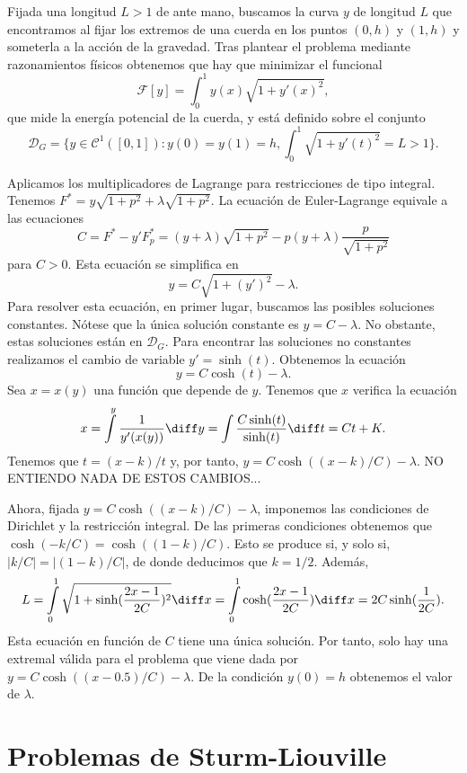 \documentclass{article}
\begin{document}
\begin{ex}
  Fijada una longitud $L > 1$ de ante mano, buscamos la curva $y$ de longitud $L$ que encontramos al
  fijar los extremos de una cuerda en los puntos $(0,h)$ y $(1, h)$ y someterla a la acción de la
  gravedad.  Tras plantear el problema mediante razonamientos físicos obtenemos que hay que
  minimizar el funcional
  \[\mathcal{F}[y] = \int_0^1 y(x) \sqrt{1 + y'(x)^2},\]
  que mide la energía potencial de la cuerda, y está definido sobre el conjunto
  \[\mathcal{D}_G = \{y \in \mathcal{C}^1([0,1]): y(0) = y(1) = h, \int_0^1 \sqrt{1 + y'(t)^2}
    = L > 1\}.\]

  Aplicamos los multiplicadores de Lagrange para restricciones de tipo integral. Tenemos
  $F^{*} = y \sqrt{1+p^2} + \lambda \sqrt{1+p^2}$. La ecuación de Euler-Lagrange equivale a las
  ecuaciones
  \[C = F^{*} - y' F_p^{*} = (y+\lambda)\sqrt{1+p^2} - p(y+\lambda) \frac{p}{\sqrt{1+p^2}}\] para
  $C > 0$. Esta ecuación se simplifica en
  \[y = C \sqrt{1+(y')^2} - \lambda.\] Para resolver esta ecuación, en primer lugar, buscamos las
  posibles soluciones constantes. Nótese que la única solución constante es $y = C-\lambda$. No
  obstante, estas soluciones están en $\mathcal{D}_G$. Para encontrar las soluciones no constantes
  realizamos el cambio de variable $y' = \sinh(t)$. Obtenemos la ecuación
  \[y = C \cosh(t) - \lambda.\] Sea $x = x(y)$ una función que depende de $y$. Tenemos que $x$
  verifica la ecuación
  \[x = \int\limits^{y} \frac{1}{y'(x(y))} \diff y = \int \frac{C\sinh(t)}{\sinh(t)} \diff t =
    Ct+K.\] Tenemos que $t = (x-k) / t$ y, por tanto, $y = C \cosh((x-k)/C) - \lambda$.  NO ENTIENDO
  NADA DE ESTOS CAMBIOS...

  Ahora, fijada $y = C \cosh((x-k)/C) - \lambda$, imponemos las condiciones de Dirichlet y la
  restricción integral. De las primeras condiciones obtenemos que $\cosh(-k/C) =
  \cosh((1-k)/C)$. Esto se produce si, y solo si, $|k/C| = |(1-k)/C|$, de donde deducimos que
  $k = 1/2$. Además,
  \[L = \int\limits_0^1 \sqrt{1+\sinh(\frac{2x-1}{2C})^2} \diff x = \int\limits_0^1
    \cosh(\frac{2x-1}{2C}) \diff x = 2C\sinh(\frac{1}{2C}).\] Esta ecuación en función de $C$ tiene
  una única solución. Por tanto, solo hay una extremal válida para el problema que viene dada por
  $y = C \cosh((x-0.5)/C) - \lambda$. De la condición $y(0) = h$ obtenemos el valor de $\lambda$.
\end{ex}

\section{Problemas de Sturm-Liouville}
\end{document}
